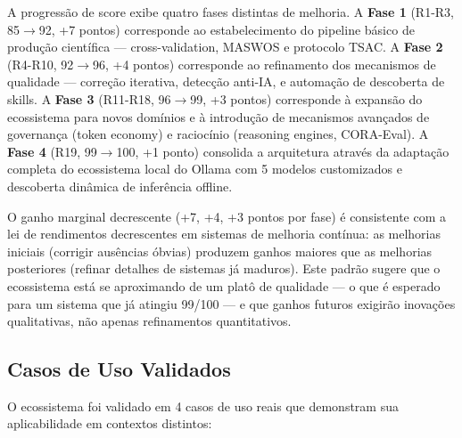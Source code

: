 A progressão de score exibe quatro fases distintas de melhoria. A \textbf{Fase 1} (R1-R3, 85$\rightarrow$92, +7 pontos) corresponde ao estabelecimento do pipeline básico de produção científica --- cross-validation, MASWOS e protocolo TSAC. A \textbf{Fase 2} (R4-R10, 92$\rightarrow$96, +4 pontos) corresponde ao refinamento dos mecanismos de qualidade --- correção iterativa, detecção anti-IA, e automação de descoberta de skills. A \textbf{Fase 3} (R11-R18, 96$\rightarrow$99, +3 pontos) corresponde à expansão do ecossistema para novos domínios e à introdução de mecanismos avançados de governança (token economy) e raciocínio (reasoning engines, CORA-Eval). A \textbf{Fase 4} (R19, 99$\rightarrow$100, +1 ponto) consolida a arquitetura através da adaptação completa do ecossistema local do Ollama com 5 modelos customizados e descoberta dinâmica de inferência offline.

O ganho marginal decrescente (+7, +4, +3 pontos por fase) é consistente com a lei de rendimentos decrescentes em sistemas de melhoria contínua: as melhorias iniciais (corrigir ausências óbvias) produzem ganhos maiores que as melhorias posteriores (refinar detalhes de sistemas já maduros). Este padrão sugere que o ecossistema está se aproximando de um platô de qualidade --- o que é esperado para um sistema que já atingiu 99/100 --- e que ganhos futuros exigirão inovações qualitativas, não apenas refinamentos quantitativos.

\subsection{Casos de Uso Validados}

O ecossistema foi validado em 4 casos de uso reais que demonstram sua aplicabilidade em contextos distintos:

